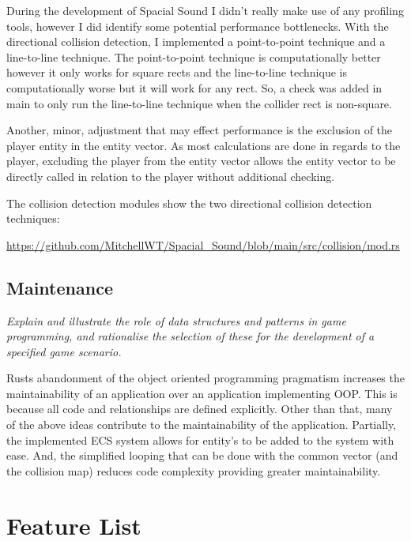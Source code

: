 \documentclass{article}
\begin{document}
\medskip

During the development of Spacial Sound I didn't really make use of any profiling tools, however I did identify some potential performance bottlenecks. With the directional collision detection, I implemented a point-to-point technique and a line-to-line technique. The point-to-point technique is computationally better however it only works for square rects and the line-to-line technique is computationally worse but it will work for any rect. So, a check was added in main to only run the line-to-line technique when the collider rect is non-square. 

\smallskip

Another, minor, adjustment that may effect performance is the exclusion of the player entity in the entity vector. As most calculations are done in regards to the player, excluding the player from the entity vector allows the entity vector to be directly called in relation to the player without additional checking.

\smallskip

The collision detection modules show the two directional collision detection techniques:

\url{https://github.com/MitchellWT/Spacial_Sound/blob/main/src/collision/mod.rs}

\subsection*{Maintenance}

\emph{Explain and illustrate the role of data structures and patterns in game programming, and rationalise the selection of these for the development of a specified game scenario.}

\medskip

Rusts abandonment of the object oriented programming pragmatism increases the maintainability of an application over an application implementing OOP. This is because all code and relationships are defined explicitly. Other than that, many of the above ideas contribute to the maintainability of the application. Partially, the implemented ECS system allows for entity's to be added to the system with ease. And, the simplified looping that can be done with the common vector (and the collision map) reduces code complexity providing greater maintainability.

\section*{Feature List}
\end{document}

